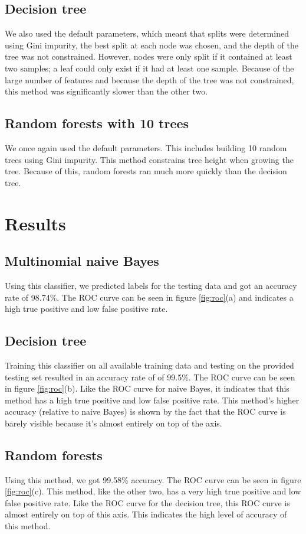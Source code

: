 \documentclass{article} %
\begin{document}
\subsection{Decision tree}
We also used the default parameters, which meant that splits were determined using Gini impurity, the best split at each node was chosen, and the depth of the tree was not constrained. However, nodes were only split if it contained at least two samples; a leaf could only exist if it had at least one sample. Because of the large number of features and because the depth of the tree was not constrained, this method was significantly slower than the other two. 

\subsection{Random forests with 10 trees}
We once again used the default parameters. This includes building 10 random trees using Gini impurity. This method constrains tree height when growing the tree. Because of this, random forests ran much more quickly than the decision tree.

\section{Results}
\subsection{Multinomial naive Bayes}
Using this classifier, we predicted labels for the testing data and got an accuracy rate of 98.74\%. The ROC curve can be seen in figure \ref{fig:roc}(a) and indicates a high true positive and low false positive rate.

\subsection{Decision tree}
Training this classifier on all available training data and testing on the provided testing set resulted in an accuracy rate of of 99.5\%. The ROC curve can be seen in figure \ref{fig:roc}(b). Like the ROC curve for naive Bayes, it indicates that this method has a high true positive and low false positive rate. This method's higher accuracy (relative to naive Bayes) is shown by the fact that the ROC curve is barely visible because it's almost entirely on top of the axis.

\subsection{Random forests}
Using this method, we got 99.58\% accuracy. The ROC curve can be seen in figure \ref{fig:roc}(c). This method, like the other two, has a very high true positive and low false positive rate. Like the ROC curve for the decision tree, this ROC curve is almost entirely on top of this axis. This indicates the high level of accuracy of this method. 
\end{document}
